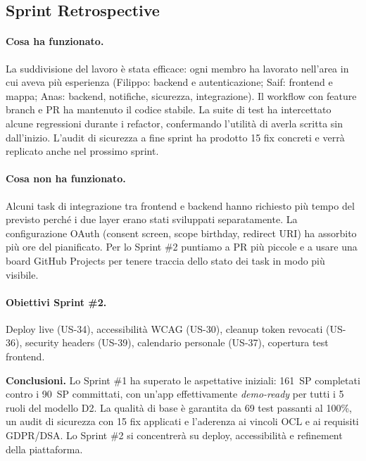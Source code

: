 \documentclass[11pt,a4paper]{article}
\begin{document}
  \subsection{Sprint Retrospective}

  \paragraph{\textcolor{accent2}{Cosa ha funzionato.}}
  La suddivisione del lavoro \`{e} stata efficace: ogni membro ha lavorato nell'area in cui
  aveva pi\`{u} esperienza (Filippo: backend e autenticazione; Saif: frontend e mappa; Anas: backend, notifiche, sicurezza, integrazione). Il workflow con feature branch e PR ha mantenuto il
  codice stabile. La suite di test ha intercettato alcune regressioni durante i refactor,
  confermando l'utilit\`{a} di averla scritta sin dall'inizio. L'audit di sicurezza a fine
  sprint ha prodotto 15 fix concreti e verr\`{a} replicato anche nel prossimo sprint.

  \paragraph{\textcolor{warn}{Cosa non ha funzionato.}}
  Alcuni task di integrazione tra frontend e backend hanno richiesto pi\`{u} tempo del previsto
  perch\'{e} i due layer erano stati sviluppati separatamente. La configurazione OAuth (consent
  screen, scope birthday, redirect URI) ha assorbito pi\`{u} ore del pianificato. Per lo
  Sprint \#2 puntiamo a PR pi\`{u} piccole e a usare una board GitHub Projects per tenere
  traccia dello stato dei task in modo pi\`{u} visibile.

  \paragraph{Obiettivi Sprint \#2.}
  Deploy live (US-34), accessibilit\`{a} WCAG (US-30), cleanup token revocati (US-36),
  security headers (US-39), calendario personale (US-37), copertura test frontend.

  \vspace{1cm}
  \begin{tcolorbox}[callout]
  \textbf{Conclusioni.} Lo Sprint \#1 ha superato le aspettative iniziali: 161~SP completati
  contro i 90~SP committati, con un'app effettivamente \emph{demo-ready} per tutti i 5 ruoli
  del modello D2. La qualit\`{a} di base \`{e} garantita da 69 test passanti al 100\%, un audit
  di sicurezza con 15 fix applicati e l'aderenza ai vincoli OCL e ai requisiti GDPR/DSA. Lo
  Sprint \#2 si concentrer\`{a} su deploy, accessibilit\`{a} e refinement della piattaforma.
  \end{tcolorbox}
\end{document}
